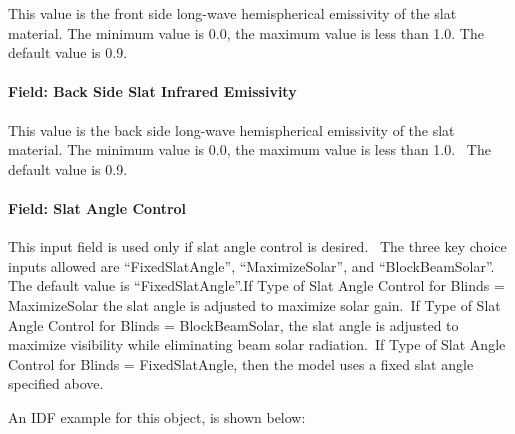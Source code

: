 This value is the front side long-wave hemispherical emissivity of the slat material. The minimum value is 0.0, the maximum value is less than 1.0. The default value is 0.9.

\paragraph{Field: Back Side Slat Infrared Emissivity}\label{field-back-side-slat-infrared-emissivity}

This value is the back side long-wave hemispherical emissivity of the slat material. The minimum value is 0.0, the maximum value is less than 1.0.~ The default value is 0.9.

\paragraph{Field: Slat Angle Control}\label{field-slat-angle-control}

This input field is used only if slat angle control is desired.~ The three key choice inputs allowed are ``FixedSlatAngle'', ``MaximizeSolar'', and ``BlockBeamSolar''.~ The default value is ``FixedSlatAngle''.If Type of Slat Angle Control for Blinds = MaximizeSolar the slat angle is adjusted to maximize solar gain.~If Type of Slat Angle Control for Blinds = BlockBeamSolar, the slat angle is adjusted to maximize visibility while eliminating beam solar radiation.~If Type of Slat Angle Control for Blinds = FixedSlatAngle, then the model uses a fixed slat angle specified above.

An IDF example for this object, is shown below:

